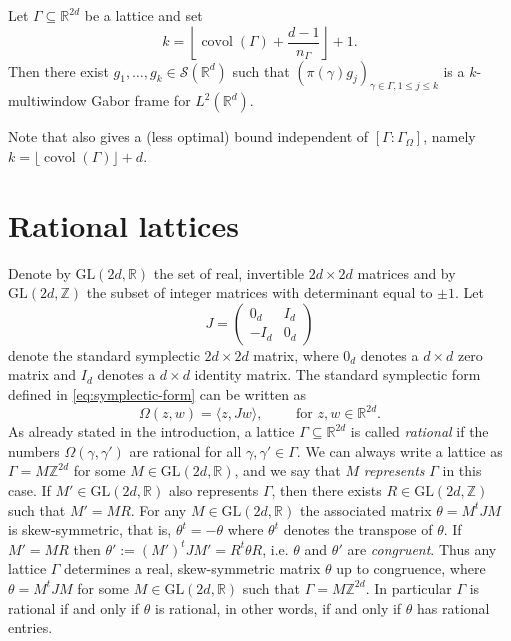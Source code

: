 \documentclass[reqno, a4paper]{amsart}
\numberwithin{equation}{section}
\newcommand{\Z}{\mathbb{Z}}   %
\newcommand{\R}{\mathbb{R}}   %
\DeclareMathOperator{\covol}{covol}
\def\subgroup#1{{#1}_\Omega}
\begin{document}
\begin{theorem}
\label{thm:2}
Let $\Gamma \subseteq \R^{2d}$ be a lattice and set
\[ 
k = \left\lfloor \covol(\Gamma) + \frac{d-1}{n_\Gamma} \right\rfloor + 1. 
\]
Then there exist $g_1, \ldots, g_k \in \mathcal{S}(\R^d)$ such that $(\pi (\gamma) g_j)_{\gamma\in\Gamma , 1\leq j\leq k}$ is a $k$-multiwindow Gabor frame for $L^2(\R^d)$.
\end{theorem}

Note that  also gives a (less optimal) bound independent of $[\Gamma : \subgroup{\Gamma}]$, namely $k = \lfloor \covol(\Gamma) \rfloor + d$.


\section{Rational lattices}\label{sec:rational_lattices}

Denote by $\mathrm{GL}(2d,\R)$ the set of real, invertible $2d \times 2d$ matrices and by $\mathrm{GL}(2d,\Z)$ the subset of integer matrices with determinant equal to $\pm 1$. Let
\[ J = \begin{pmatrix} 0_{d} & I_{d} \\ -I_{d} & 0_{d} \end{pmatrix} \]
denote the standard symplectic $2d \times 2d$ matrix, where $0_d$ denotes a $d \times d$ zero matrix and $I_d$ denotes a $d \times d$ identity matrix. The standard symplectic form defined in \eqref{eq:symplectic-form} can be written as
\[
\Omega(z,w) = \langle z, J w \rangle, 
\qquad \text{ for } z,w \in \R^{2d}.
\]
As already stated in the introduction, a lattice $\Gamma \subseteq \R^{2d}$ is called \emph{rational} if the numbers $\Omega(\gamma,\gamma')$ are rational for all $\gamma,\gamma' \in \Gamma$. 
We can always write a lattice as $\Gamma = M \Z^{2d}$ for some $M \in \mathrm{GL}(2d,\R)$, and we say that $M$ \emph{represents} $\Gamma$ in this case. If $M' \in \mathrm{GL}(2d,\R)$ also represents $\Gamma$, then there exists $R \in \mathrm{GL}(2d,\Z)$ such that $M' = M R$. 
For any $M \in \mathrm{GL}(2d,\R)$ the associated matrix $\theta = M^t J M$ is skew-symmetric, that is, $\theta^t = -\theta$ where $\theta^t$ denotes the transpose of $\theta$. 
If $M' = M R$ then $\theta' := (M')^t J M' = R^t \theta R$, i.e. $\theta$ and $\theta'$ are \emph{congruent}. 
Thus any lattice $\Gamma$ determines a real, skew-symmetric matrix $\theta$ up to congruence, where $\theta = M^t J M$ for some $M \in \mathrm{GL}(2d,\R)$ such that $\Gamma = M \Z^{2d}$. 
In particular $\Gamma$ is rational if and only if $\theta$ is rational, in other words, if and only if $\theta$ has rational entries.
\end{document}
